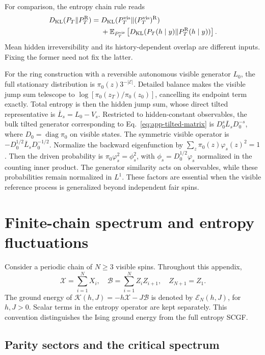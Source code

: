 \documentclass[aps,pre,reprint,amsmath,amssymb,longbibliography,floatfix]{revtex4-2}
\newcommand{\E}{\mathbb E}
\newcommand{\KL}{D_{\mathrm{KL}}}
\begin{document}
For comparison, the entropy chain rule reads
\begin{align}
 \KL(P_T\Vert P_T^{\rm R})
 ={}&\KL(P_T^{\rm vis}\Vert
                  (P_T^{\rm vis})^{\rm R})
 \label{eq:app-kl-chain}\\
 &+\E_{P_T^{\rm vis}}\left[\KL(P_T(h\mid y)\Vert P_T^{\rm R}(h\mid y))\right]. \notag
\end{align}
Mean hidden irreversibility and its history-dependent overlap are
different inputs. Fixing the former need not fix the latter.

For the ring construction with a reversible autonomous visible
generator $L_0$, the full stationary distribution is
$\pi_0(z)3^{-|\mathcal E|}$. Detailed balance makes the visible jump
sum telescope to $\log\left[\pi_0(z_T)/\pi_0(z_0)\right]$, cancelling its endpoint
term exactly. Total entropy is then the hidden jump sum, whose
direct tilted representative is $\overline L_s=L_0-V_s$.
Restricted to hidden-constant observables, the bulk tilted generator
corresponding to Eq.~\eqref{eq:app-tilted-matrix} is
$D_0^s\overline L_sD_0^{-s}$, where
$D_0=\operatorname{diag}\pi_0$ on visible states. The symmetric visible
operator is
$-D_0^{1/2}\overline L_sD_0^{-1/2}$.
Normalize the backward eigenfunction by
$\sum_z\pi_0(z)\varphi_s(z)^2=1$. Then the driven probability is
$\pi_0\varphi_s^2=\phi_s^2$, with
$\phi_s=D_0^{1/2}\varphi_s$ normalized in the counting inner product.
The generator similarity acts on observables, while these probabilities
remain normalized in $L^1$. These factors are essential when the visible reference
process is generalized beyond independent fair spins.

\section{Finite-chain spectrum and entropy fluctuations}
\label{app:ising}

Consider a periodic chain of $N\geq3$ visible spins. Throughout this appendix,
\begin{equation}
 \mathcal X=\sum_{i=1}^N X_i,\quad
 \mathcal B=\sum_{i=1}^N Z_iZ_{i+1},\quad Z_{N+1}=Z_1.
 \label{eq:appendix-spin-sums}
\end{equation}
The ground energy of $\mathcal K(h,J)=-h\mathcal X-J\mathcal B$ is denoted by
$\mathcal E_N(h,J)$, for $h,J>0$. Scalar terms in the entropy operator
are kept separately. This convention distinguishes the Ising ground energy
from the full entropy SCGF.

\subsection{Parity sectors and the critical spectrum}
\end{document}
